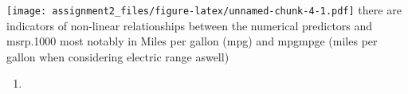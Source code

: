 \documentclass[]{article}
\newenvironment{Shaded}{\begin{snugshade}}{\end{snugshade}}
\newcommand{\DataTypeTok}[1]{\textcolor[rgb]{0.13,0.29,0.53}{#1}}
\newcommand{\FloatTok}[1]{\textcolor[rgb]{0.00,0.00,0.81}{#1}}
\newcommand{\KeywordTok}[1]{\textcolor[rgb]{0.13,0.29,0.53}{\textbf{#1}}}
\newcommand{\NormalTok}[1]{#1}
\newcommand{\OperatorTok}[1]{\textcolor[rgb]{0.81,0.36,0.00}{\textbf{#1}}}
\newcommand{\OtherTok}[1]{\textcolor[rgb]{0.56,0.35,0.01}{#1}}
\newcommand{\StringTok}[1]{\textcolor[rgb]{0.31,0.60,0.02}{#1}}
\begin{document}
\begin{Shaded}
\end{Shaded}

\texttt{[image: assignment2\_files/figure-latex/unnamed-chunk-4-1.pdf]}
there are indicators of non-linear relationships between the numerical
predictors and msrp.1000 most notably in Miles per gallon (mpg) and
mpgmpge (miles per gallon when considering electric range aswell)

\begin{enumerate}
\def\labelenumi{\alph{enumi})}
\setcounter{enumi}{2}
\item
\end{enumerate}
\end{document}
